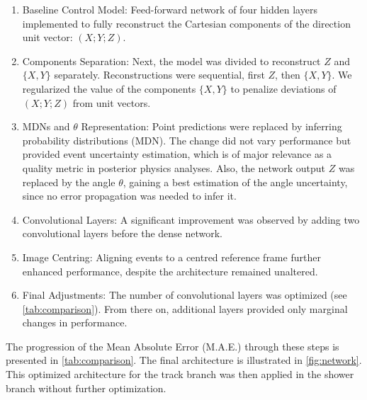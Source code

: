 \begin{enumerate}[label={\textit{\roman*})}]
	\item Baseline Control Model: Feed-forward network of four hidden layers implemented to fully reconstruct the Cartesian components of the direction unit vector: $(X;Y;Z)$.
	
	\item Components Separation: Next, the model was divided to reconstruct $Z$ and $\{X,Y\}$ separately. Reconstructions were sequential, first $Z$, then $\{X,Y\}$. We regularized the value of the components $\{X,Y\}$ to penalize deviations of $(X;Y;Z)$ from unit vectors.
	
	\item MDNs and $\theta$ Representation: Point predictions were replaced by inferring probability distributions (MDN). The change did not vary performance but provided event uncertainty estimation, which is of major relevance as a quality metric in posterior physics analyses. Also, the network output $Z$ was replaced by the angle $\theta$, gaining a best estimation of the angle uncertainty, since no error propagation was needed to infer it. %
	
	\item Convolutional Layers: A significant improvement was observed by adding two convolutional layers before the dense network.
	
	\item Image Centring: Aligning events to a centred reference frame further enhanced performance, despite the architecture remained unaltered.
	
	\item Final Adjustments: The number of convolutional layers was optimized (see \autoref{tab:comparison}). From there on, additional layers provided only marginal changes in performance.
	
\end{enumerate}

The progression of the Mean Absolute Error (M.A.E.) through these steps is presented in \autoref{tab:comparison}. The final architecture is illustrated in \autoref{fig:network}. This optimized architecture for the track branch was then applied in the shower branch without further optimization.


